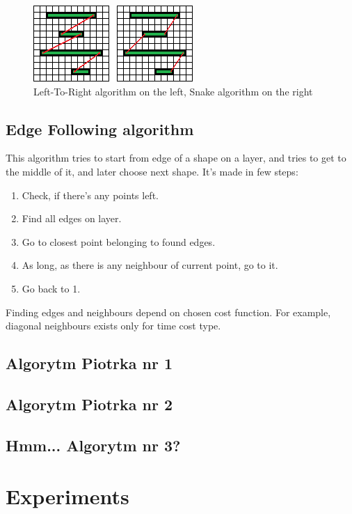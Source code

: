 \documentclass[titlepage]{article}
\begin{document}
\begin{figure}
\begin{center}
\includegraphics[scale=2]{img/ltr-vs-snake}
\caption{Left-To-Right algorithm on the left, Snake algorithm on the right}
\label{img:ltr-vs-snake}
\end{center}
\end{figure}

\subsection{Edge Following algorithm}
This algorithm tries to start from edge of a shape on a layer, and tries to get to the middle of it, and later choose next shape.
It's made in few steps:
\begin{enumerate}
\item Check, if there's any points left.
\item Find all edges on layer.
\item Go to closest point belonging to found edges.
\item As long, as there is any neighbour of current point, go to it.
\item Go back to 1.
\end{enumerate}
Finding edges and neighbours depend on chosen cost function. For example, diagonal neighbours exists only for time cost type.

\subsection{Algorytm Piotrka nr 1}

\subsection{Algorytm Piotrka nr 2}

\subsection{Hmm... Algorytm nr 3?}

\section{Experiments}
\end{document}
